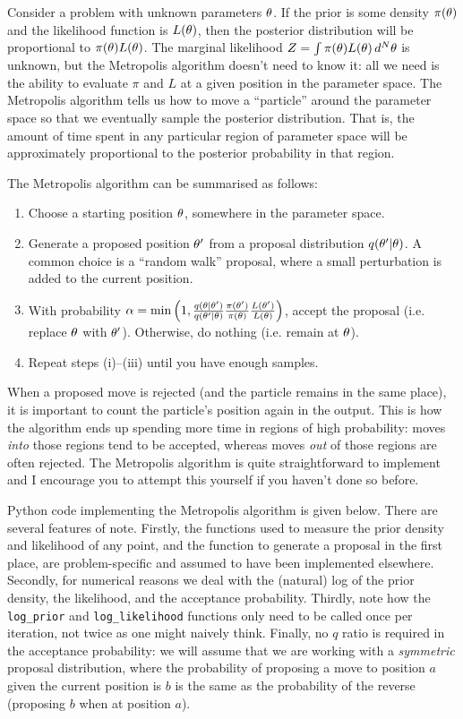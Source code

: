 Consider a problem with unknown
parameters $\theta$. If the prior is some density $\pi(\theta)$ and the likelihood
function is $L(\theta)$, then the posterior distribution will be
proportional to $\pi(\theta)L(\theta)$. The marginal likelihood
$Z = \int \pi(\theta) L(\theta) \, d^N\theta$ is unknown,
but the Metropolis algorithm doesn't need to know it: all we need is the
ability to evaluate $\pi$ and $L$ at a given position in the parameter space. The Metropolis algorithm tells us how to move a ``particle'' around the
parameter space so that we eventually sample the posterior distribution.
That is, the amount of time spent in any particular region of parameter space
will be approximately proportional to the posterior probability in that
region.

The Metropolis algorithm can be summarised as follows:
\begin{enumerate}
\item Choose a starting position $\theta$, somewhere in the parameter space.
\item Generate a proposed position $\theta'$ from a proposal distribution
$q(\theta'|\theta)$. A common choice is a ``random walk'' proposal, where a small
perturbation is added to the current position.
\item With probability
$\alpha=\min\left(1, \frac{q(\theta|\theta')}{q(\theta'|\theta)}\frac{\pi(\theta')}{\pi(\theta)}\frac{L(\theta')}{L(\theta)}\right)$, accept the proposal
(i.e. replace $\theta$ with $\theta'$). Otherwise, do nothing (i.e. remain at $\theta$).
\item Repeat steps (i)--(iii) until you have enough samples.
\end{enumerate}

When a proposed move is rejected (and the particle remains in the same place),
it is important to count the particle's position again in the output. This is
how the algorithm ends up spending more time in regions of high probability:
moves {\it into} those regions tend to be accepted, whereas moves {\it out}
of those regions are often rejected. The Metropolis algorithm is quite straightforward to implement and I encourage
you to attempt this yourself if you haven't done so before.

Python code implementing the Metropolis algorithm is given below. There are
several features of note. Firstly, the functions used to measure the prior
density and likelihood of any point, and the function to generate a proposal
in the first place, are problem-specific and assumed to have
been implemented elsewhere. Secondly, for numerical reasons we deal with the
(natural) log of the prior density, the likelihood, and the acceptance
probability. Thirdly, note how the {\tt log\_prior} and {\tt log\_likelihood}
functions only need to be called once per iteration, not twice as one might
naively think. Finally, no $q$ ratio is required in the acceptance probability:
we will assume that we are working with a {\it symmetric} proposal distribution,
where the probability of proposing a move to position $a$ given the current
position is $b$ is the same as the probability of the reverse (proposing
$b$ when at position $a$).

